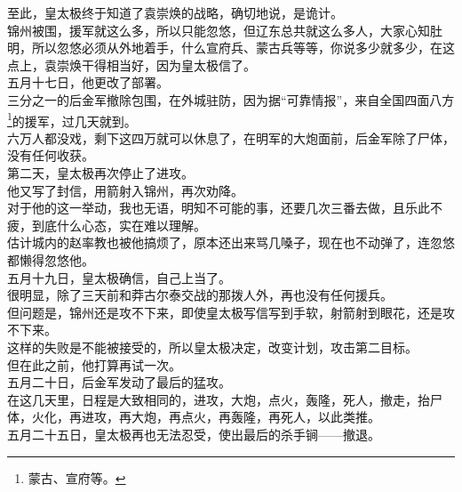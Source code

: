\begin{multicols}{\theparacolNo}
至此，皇太极终于知道了袁崇焕的战略，确切地说，是诡计。\\

锦州被围，援军就这么多，所以只能忽悠，但辽东总共就这么多人，大家心知肚明，所以忽悠必须从外地着手，什么宣府兵、蒙古兵等等，你说多少就多少，在这点上，袁崇焕干得相当好，因为皇太极信了。\\

五月十七日，他更改了部署。\\

三分之一的后金军撤除包围，在外城驻防，因为据“可靠情报”，来自全国四面八方\footnote{蒙古、宣府等。}的援军，过几天就到。\\

六万人都没戏，剩下这四万就可以休息了，在明军的大炮面前，后金军除了尸体，没有任何收获。\\

第二天，皇太极再次停止了进攻。\\

他又写了封信，用箭射入锦州，再次劝降。\\

对于他的这一举动，我也无语，明知不可能的事，还要几次三番去做，且乐此不疲，到底什么心态，实在难以理解。\\

估计城内的赵率教也被他搞烦了，原本还出来骂几嗓子，现在也不动弹了，连忽悠都懒得忽悠他。\\

五月十九日，皇太极确信，自己上当了。\\

很明显，除了三天前和莽古尔泰交战的那拨人外，再也没有任何援兵。\\

但问题是，锦州还是攻不下来，即使皇太极写信写到手软，射箭射到眼花，还是攻不下来。\\

这样的失败是不能被接受的，所以皇太极决定，改变计划，攻击第二目标。\\

但在此之前，他打算再试一次。\\

五月二十日，后金军发动了最后的猛攻。\\

在这几天里，日程是大致相同的，进攻，大炮，点火，轰隆，死人，撤走，抬尸体，火化，再进攻，再大炮，再点火，再轰隆，再死人，以此类推。\\

五月二十五日，皇太极再也无法忍受，使出最后的杀手锏——撤退。\\


\end{multicols}
